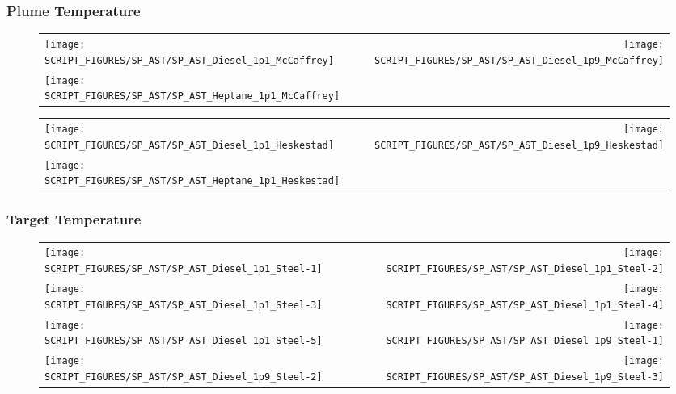 \clearpage

\subsubsection{Plume Temperature}

\begin{figure}[!ht]
\begin{tabular*}{\textwidth}{l@{\extracolsep{\fill}}r}
\texttt{[image: SCRIPT\_FIGURES/SP\_AST/SP\_AST\_Diesel\_1p1\_McCaffrey]} &
\texttt{[image: SCRIPT\_FIGURES/SP\_AST/SP\_AST\_Diesel\_1p9\_McCaffrey]} \\
\texttt{[image: SCRIPT\_FIGURES/SP\_AST/SP\_AST\_Heptane\_1p1\_McCaffrey]}
\end{tabular*}
\end{figure}

\begin{figure}[!ht]
\begin{tabular*}{\textwidth}{l@{\extracolsep{\fill}}r}
\texttt{[image: SCRIPT\_FIGURES/SP\_AST/SP\_AST\_Diesel\_1p1\_Heskestad]} &
\texttt{[image: SCRIPT\_FIGURES/SP\_AST/SP\_AST\_Diesel\_1p9\_Heskestad]} \\
\texttt{[image: SCRIPT\_FIGURES/SP\_AST/SP\_AST\_Heptane\_1p1\_Heskestad]}
\end{tabular*}
\end{figure}

\clearpage

\subsubsection{Target Temperature}

\begin{figure}[!ht]
\begin{tabular*}{\textwidth}{l@{\extracolsep{\fill}}r}
\texttt{[image: SCRIPT\_FIGURES/SP\_AST/SP\_AST\_Diesel\_1p1\_Steel-1]} &
\texttt{[image: SCRIPT\_FIGURES/SP\_AST/SP\_AST\_Diesel\_1p1\_Steel-2]} \\
\texttt{[image: SCRIPT\_FIGURES/SP\_AST/SP\_AST\_Diesel\_1p1\_Steel-3]} &
\texttt{[image: SCRIPT\_FIGURES/SP\_AST/SP\_AST\_Diesel\_1p1\_Steel-4]} \\
\texttt{[image: SCRIPT\_FIGURES/SP\_AST/SP\_AST\_Diesel\_1p1\_Steel-5]} &
\texttt{[image: SCRIPT\_FIGURES/SP\_AST/SP\_AST\_Diesel\_1p9\_Steel-1]} \\
\texttt{[image: SCRIPT\_FIGURES/SP\_AST/SP\_AST\_Diesel\_1p9\_Steel-2]} &
\texttt{[image: SCRIPT\_FIGURES/SP\_AST/SP\_AST\_Diesel\_1p9\_Steel-3]}
\end{tabular*}
\end{figure}

